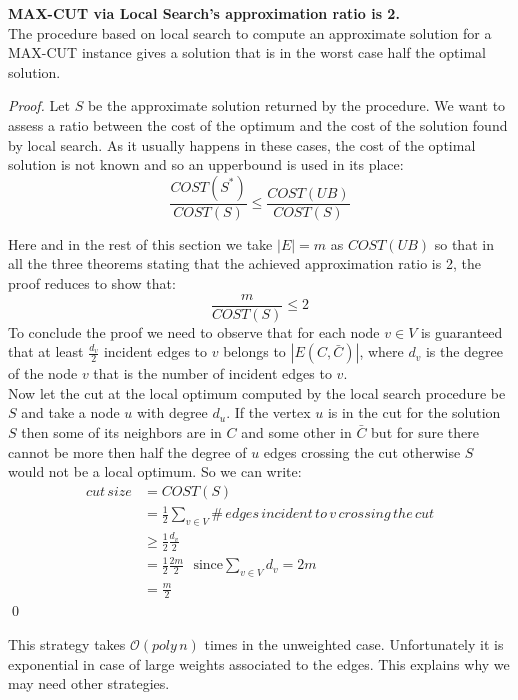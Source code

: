 \begin{theorem}{\textbf{MAX-CUT via Local Search's approximation ratio is 2.}}
\\
  The procedure based on local search to compute an approximate solution for a MAX-CUT instance gives a solution that is in the worst case half the optimal solution.
\end{theorem}
\begin{proof}
  Let $S$ be the approximate solution returned by the procedure.
  We want to assess a ratio between the cost of the optimum and the cost of the solution found by local search.
  As it usually happens in these cases, the cost of the optimal solution is not known and so an upperbound is used in its place:
  \[ \frac{COST(S^{*})}{COST(S)} \leq \frac{COST(UB)}{COST(S)} \]
  
  Here and in the rest of this section we take $|E|=m $ as $COST(UB)$ so that in all the three theorems stating that the achieved approximation ratio is 2, the proof reduces to show that:
  \[ \frac{m}{COST(S)} \leq 2 \]
  To conclude the proof we need to observe that for each node $v \in V$ is guaranteed that at least $\frac{d_v}{2}$ incident edges to $ v $ belongs to $|E(C,\bar{C})|$, where $ d_v $ is the degree of the node $ v $ that is the number of incident edges to $ v $.\\
  Now let the cut at the local optimum computed by the local search procedure be $ S $ and take a node $ u $ with degree $ d_u $. If the vertex $u$ is in the cut for the solution $S$ then some of its neighbors are in $C$ and some other in $\bar{C}$ but for sure there cannot be more then half the degree of $u$ edges crossing the cut otherwise $S$ would not be a local optimum.
  So we can write:
  \begin{align}
  cut\, size & = COST(S) \\
             & = \frac{1}{2} \sum_{v \in V} \#\, edges\,incident\,to\,v \,crossing\, the\, cut \\
             & \geq \frac{1}{2} \frac{d_v}{2}  \\
             & = \frac{1}{2} \frac{2m}{2} \,\,\,\, \text{since} \sum_{v \in V} d_v = 2m\\
             & = \frac{m}{2}
  \end{align}
  \qed
  
  
  
\end{proof}

This strategy takes $\mathcal{O}(poly\, n)$ times in the unweighted case. Unfortunately it is exponential in case of large weights associated to the edges. This explains why we may need other strategies.


